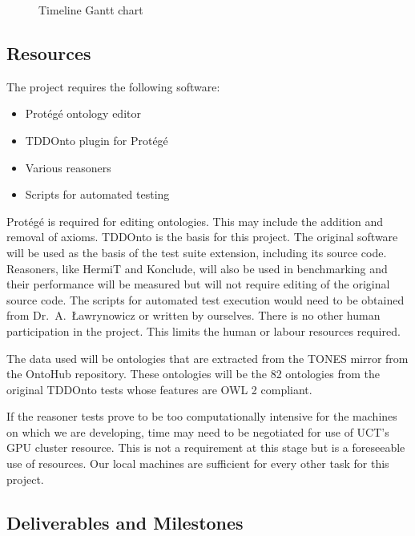 \documentclass[draft]{sig-alternate}
\begin{document}
\begin{sidewaysfigure*}
  \caption{Timeline Gantt chart}
  \label{fig:gantt}
  \vspace{6pt}
  \hspace{-1.5cm}
  
\end{sidewaysfigure*}

\subsection{Resources}

The project requires the following software:
\begin{itemize}[noitemsep]
  \item Prot\'eg\'e ontology editor
  \item TDDOnto plugin for Prot\'eg\'e
  \item Various reasoners
  \item Scripts for automated testing
\end{itemize}

Prot\'eg\'e is required for editing ontologies. This may include the addition and removal of axioms. TDDOnto is the basis for this project. The original software will be used as the basis of the test suite extension, including its source code. Reasoners, like HermiT and Konclude, will also be used in benchmarking and their performance will be measured but will not require editing of the original source code. The scripts for automated test execution would need to be obtained from Dr.\ A.\ {\L}awrynowicz or written by ourselves. There is no other human participation in the project. This limits the human or labour resources required.

The data used will be ontologies that are extracted from the TONES mirror from the OntoHub repository. These ontologies will be the 82 ontologies from the original TDDOnto tests whose features are OWL 2 compliant.

If the reasoner tests prove to be too computationally intensive for the machines on which we are developing, time may need to be negotiated for use of UCT's GPU cluster resource. This is not a requirement at this stage but is a foreseeable use of resources. Our local machines are sufficient for every other task for this project.

\subsection{Deliverables and Milestones}
\end{document}
